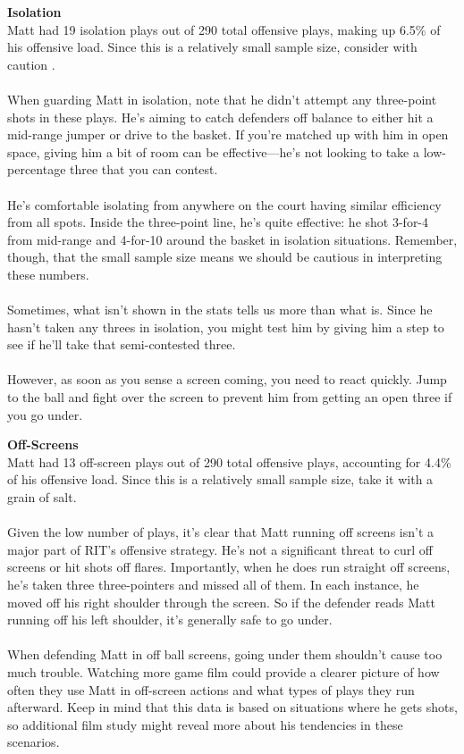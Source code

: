 \documentclass[a4paper,12pt]{article}
\begin{document}
\begin{multicols}{2}
    {\large \noindent \textbf{Isolation}} \\
    Matt had 19 isolation plays out of 290 total offensive plays, making up 6.5\% of his offensive load. Since this is a relatively small sample size,  consider with caution . \\ \\
    When guarding Matt in isolation, note that he didn't attempt any three-point shots in these plays. He's aiming to catch defenders off balance to either hit a mid-range jumper or drive to the basket. If you're matched up with him in open space, giving him a bit of room can be effective—he's not looking to take a low-percentage three that you can contest. \\ \\
    He's comfortable isolating from anywhere on the court having similar efficiency from all spots. Inside the three-point line, he's quite effective: he shot 3-for-4 from mid-range and 4-for-10 around the basket in isolation situations. Remember, though, that the small sample size means we should be cautious in interpreting these numbers. \\ \\
    Sometimes, what isn't shown in the stats tells us more than what is. Since he hasn't taken any threes in isolation, you might test him by giving him a step to see if he'll take that semi-contested three. \\ \\
    However, as soon as you sense a screen coming, you need to react quickly. Jump to the ball and fight over the screen to prevent him from getting an open three if you go under. \vspace{1em}
    
    {\large \noindent \textbf{Off-Screens}} \\
    Matt had 13 off-screen plays out of 290 total offensive plays, accounting for 4.4\% of his offensive load. Since this is a relatively small sample size, take it with a grain of salt. \\ \\
    Given the low number of plays, it's clear that Matt running off screens isn't a major part of RIT's offensive strategy. He's not a significant threat to curl off screens or hit shots off flares. Importantly, when he does run straight off screens, he's taken three three-pointers and missed all of them. In each instance, he moved off his right shoulder through the screen. So if the defender reads Matt running off his left shoulder, it's generally safe to go under.\\ \\
    When defending Matt in off ball screens, going under them shouldn't cause too much trouble. Watching more game film could provide a clearer picture of how often they use Matt in off-screen actions and what types of plays they run afterward. Keep in mind that this data is based on situations where he gets shots, so additional film study might reveal more about his tendencies in these scenarios. \vspace{1em}
    

\end{multicols}
\end{document}
